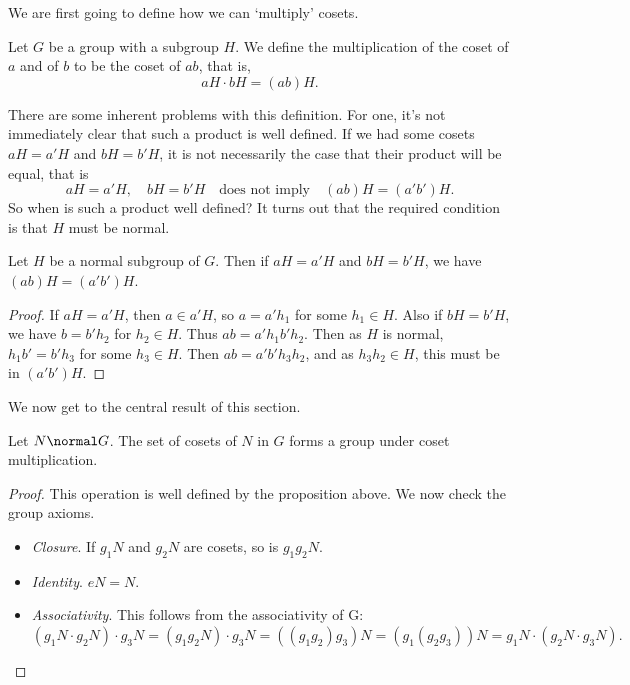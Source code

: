 \documentclass[a4]{scrreprt}
\begin{document}
We are first going to define how we can `multiply' cosets.

\begin{definition}
Let $G$ be a group with a subgroup $H$. We define the multiplication of the coset of $a$ and of $b$ to be the coset of $ab$, that is,
$$
aH \cdot bH = (ab)H.
$$
\end{definition}

There are some inherent problems with this definition. For one, it's not immediately clear that such a product is well defined.
If we had some cosets $aH = a'H$ and $bH = b'H$, it is not necessarily the case that their product will be equal, that is
$$
aH = a'H, \quad bH = b'H \quad \text{does not imply} \quad (ab)H = (a'b')H.
$$
So when is such a product well defined? It turns out that the required condition is that $H$ must be normal.

\begin{proposition}
	Let $H$ be a normal subgroup of $G$. Then if $aH = a'H$ and $bH = b'H$, we have $(ab)H = (a'b')H$.
\end{proposition}
\begin{proof}
	If $aH = a'H$, then $a \in a'H$, so $a = a' h_1$ for some $h_1 \in H$. Also if $bH = b'H$, we have $b = b' h_2$ for $h_2 \in H$. Thus
	$ab = a' h_1 b' h_2 $. Then as $H$ is normal,  $h_1 b' = b' h_3$ for some $h_3 \in H$. Then
	$ab = a' b' h_3 h_2$, and as $h_3 h_2 \in H$, this must be in $(a'b')H$.
\end{proof}

We now get to the central result of this section.

\begin{proposition}
	Let $N \normal G$. The set of cosets of $N$ in $G$ forms a group under coset multiplication.
\end{proposition}
\begin{proof}
	This operation is well defined by the proposition above. We now check the group axioms.
	\begin{itemize}
		\item \emph{Closure}. If $g_1N$ and $g_2 N$ are cosets, so is $g_1 g_2 N$.
		\item \emph{Identity}. $eN = N$.
		\item \emph{Associativity}. This follows from the associativity of G:
		$
		(g_1 N \cdot g_2 N) \cdot g_3 N = (g_1 g_2 N) \cdot g_3 N = ((g_1 g_2) g_3) N = (g_1 (g_2 g_3))N = g_1 N \cdot (g_2 N \cdot g_3 N).
		$
 	\end{itemize}
\end{proof}
\end{document}

